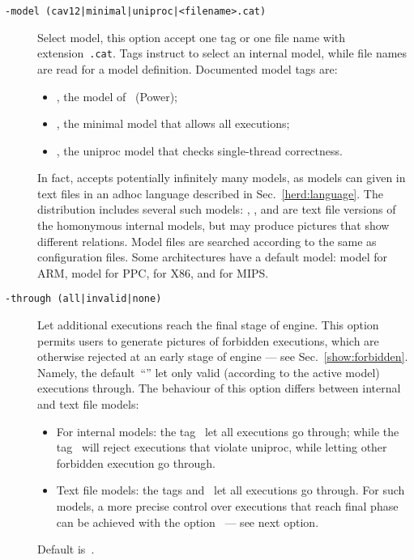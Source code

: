 \begin{description}
\item[{\tt -model (cav12|minimal|uniproc|<filename>.cat)}]
Select model, this option accept one tag or one file name
with extension~\texttt{.cat}.
Tags instruct \herd{} to select an internal model,
while file names are read for a model definition.
Documented model tags are:
\begin{itemize}
\item {}, the model of~\cite{mms12} (Power);
\item {}, the minimal model that allows all executions;
\item {}, the uniproc model that checks single-thread correctness.
\end{itemize}

In fact, \herd{} accepts potentially infinitely many models,
as models can given in text files in an adhoc language described in
Sec.~\ref{herd:language}.
The \herd{} distribution includes several such models:
, , 
and  are
text file versions of the homonymous internal models, but may
produce pictures that show different relations.
Model files are searched according to  the same
as configuration files.
Some architectures have a default model:
 model for ARM,  model for PPC,
 for X86, and  for MIPS.

\item[{\tt -through (all|invalid|none)}]
Let additional executions reach the final stage of \herd{} engine.
This option permits users to generate pictures of forbidden executions, which
are otherwise rejected at an early stage of \herd{} engine --- see Sec.~\ref{show:forbidden}.
Namely, the default~``'' let only valid (according to the
active model) executions through.
The behaviour of this option differs between internal and text file models:
\begin{itemize}
\item For internal models:
the tag~ let all executions go through;
while the tag~ will reject executions that violate uniproc,
while letting other forbidden execution go through.
\item Text file models: the tags  and~ let all
executions go through. For such models, a more precise control over
executions that reach \herd{} final phase can be achieved
with the option~ --- see  next option.
\end{itemize}
Default is~.


\end{description}
